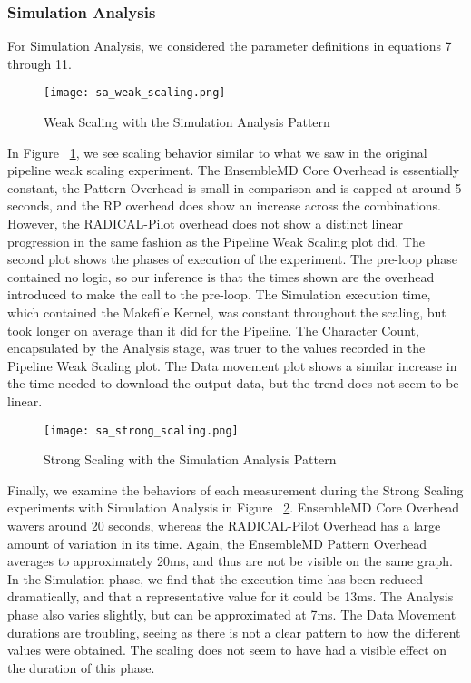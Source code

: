 \documentclass[]{article}
\begin{document}
		\pagebreak
		\subsubsection{Simulation Analysis}

			For Simulation Analysis, we considered the parameter definitions in equations 7 through 11.

			\begin{figure}[H]
				\centering
				\texttt{[image: sa\_weak\_scaling.png]}
				\caption{Weak Scaling with the Simulation Analysis Pattern}
				\label{fig:sa_weak_scaling}
			\end{figure}

			In Figure ~\ref{fig:sa_weak_scaling}, we see scaling behavior similar to what we saw in the original pipeline weak scaling experiment. The EnsembleMD Core Overhead is essentially constant, the Pattern Overhead is small in comparison and is capped at around 5 seconds, and the RP overhead does show an increase across the combinations. However, the RADICAL-Pilot overhead does not show a distinct linear progression in the same fashion as the Pipeline Weak Scaling plot did. 
			The second plot shows the phases of execution of the experiment. The pre-loop phase contained no logic, so our inference is that the times shown are the overhead introduced to make the call to the pre-loop. The Simulation execution time, which contained the Makefile Kernel, was constant throughout the scaling, but took longer on average than it did for the Pipeline. The Character Count, encapsulated by the Analysis stage, was truer to the values recorded in the Pipeline Weak Scaling plot.
			The Data movement plot shows a similar increase in the time needed to download the output data, but the trend does not seem to be linear. 

			\begin{figure}[H]
				\centering
				\texttt{[image: sa\_strong\_scaling.png]}
				\caption{Strong Scaling with the Simulation Analysis Pattern}
				\label{fig:sa_strong_scaling}
			\end{figure}
			
			Finally, we examine the behaviors of each measurement during the Strong Scaling experiments with Simulation Analysis in Figure ~\ref{fig:sa_strong_scaling}. EnsembleMD Core Overhead wavers around 20 seconds, whereas the RADICAL-Pilot Overhead has a large amount of variation in its time. Again, the EnsembleMD Pattern Overhead averages to approximately 20ms, and thus are not be visible on the same graph.
			In the Simulation phase, we find that the execution time has been reduced dramatically, and that a representative value for it could be 13ms. The Analysis phase also varies slightly, but can be approximated at 7ms.
			The Data Movement durations are troubling, seeing as there is not a clear pattern to how the different values were obtained. The scaling does not seem to have had a visible effect on the duration of this phase.
\end{document}
